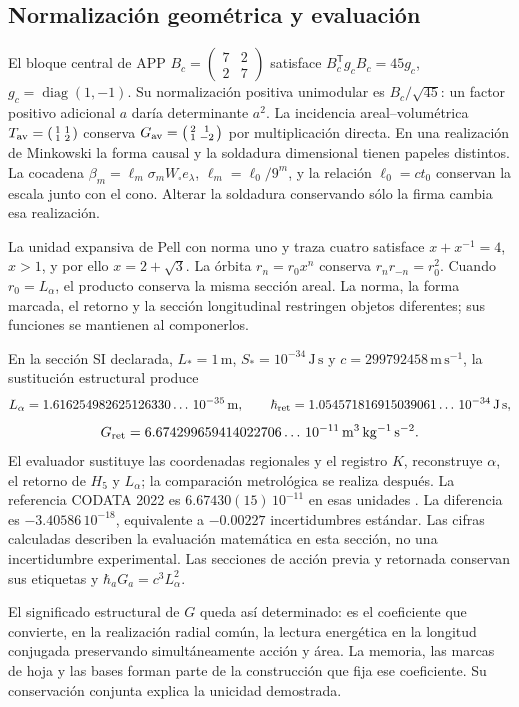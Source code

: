 \subsection{Normalización geométrica y evaluación}
\label{md:rigidez:evaluacion}

El bloque central de APP
$B_c=\left(\begin{smallmatrix}7&2\\2&7\end{smallmatrix}\right)$
satisface $B_c^{\mathsf T}g_cB_c=45g_c$,
$g_c=\operatorname{diag}(1,-1)$. Su normalización positiva unimodular es
$B_c/\sqrt{45}$: un factor positivo adicional $a$ daría determinante $a^2$.
La incidencia areal--volumétrica
$T_{\rm av}=\left(\begin{smallmatrix}1&1\\1&2\end{smallmatrix}\right)$
conserva
$G_{\rm av}=\left(\begin{smallmatrix}2&1\\1&-2\end{smallmatrix}\right)$
por multiplicación directa.
En una realización de Minkowski la forma causal y la soldadura dimensional
tienen papeles distintos. La cocadena
$\beta_m=\ell_m\sigma_mW_\square e_\lambda$,
$\ell_m=\ell_0/9^m$, y la relación $\ell_0=ct_0$ conservan la escala
junto con el cono. Alterar la soldadura conservando sólo la firma cambia
esa realización.

La unidad expansiva de Pell con norma uno y traza cuatro satisface
$x+x^{-1}=4$, $x>1$, y por ello $x=2+\sqrt3$.
La órbita $r_n=r_0x^n$ conserva $r_nr_{-n}=r_0^2$.
Cuando $r_0=L_\alpha$, el producto conserva la misma sección areal.
La norma, la forma marcada, el retorno y la sección longitudinal restringen
objetos diferentes; sus funciones se mantienen al componerlos.

En la sección SI declarada, $L_*=1\,\mathrm m$,
$S_*=10^{-34}\,\mathrm{J\,s}$ y $c=299792458\,\mathrm{m\,s^{-1}}$,
la sustitución estructural produce
\[
 L_\alpha=1.616254982625126330\ldots\,10^{-35}\,\mathrm m,\qquad
 \hbar_{\rm ret}=1.054571816915039061\ldots\,10^{-34}\,\mathrm{J\,s},
\]
\begin{equation}
 G_{\rm ret}=6.674299659414022706\ldots\,10^{-11}
 \,\mathrm{m^3\,kg^{-1}\,s^{-2}}.
 \label{md:rigidez:valor}
\end{equation}
El evaluador sustituye las coordenadas regionales y el registro $K$,
reconstruye $\alpha$, el retorno de $H_5$ y $L_\alpha$; la comparación
metrológica se realiza después. La referencia CODATA 2022 es
$6.67430(15)\,10^{-11}$ en esas unidades \cite{codata2022}.
La diferencia es $-3.40586\,10^{-18}$, equivalente a
$-0.00227$ incertidumbres estándar. Las cifras calculadas describen la
evaluación matemática en esta sección, no una incertidumbre experimental.
Las secciones de acción previa y retornada conservan sus etiquetas y
$\hbar_aG_a=c^3L_\alpha^2$.

El significado estructural de $G$ queda así determinado: es el coeficiente
que convierte, en la realización radial común, la lectura energética en
la longitud conjugada preservando simultáneamente acción y área.
La memoria, las marcas de hoja y las bases forman parte de la construcción
que fija ese coeficiente. Su conservación conjunta explica la unicidad
demostrada.
